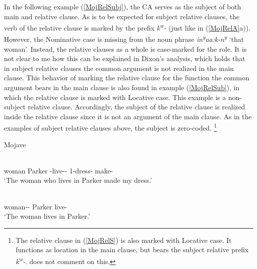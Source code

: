 In the following example (\ref{MojRelSubj}), the CA serves as the subject of both main and relative clause. 
As is to be expected for subject relative clauses, the verb of the relative clause is marked by the prefix \emph{k\textsuperscript{w}-} (just like in (\ref{MojRelA}a)).  
However, the Nominative case is missing from the noun phrase \emph{\textschwa in\textsuperscript{y}a\textglotstop a:k-n\textsuperscript{y}} `that woman'.
Instead, the relative clauses as a whole is case-marked for the role. 
It is not clear to me how this can be explained in Dixon's analysis, which holds that in subject relative clauses the common argument is not realized in the main clause.
This behavior of marking the relative clause for the function the common argument bears in the main clause is also found in example (\ref{MojRelSub}), in which the relative clause is marked with Locative case.
This example is a non-subject relative clause. 
Accordingly, the subject of the relative clause is realized inside the relative clause since it is not an argument of the main clause. 
As in the examples of subject relative clauses above, the subject is zero-coded.
\footnote{The relative clause in (\ref{MojRelS}) is also marked with Locative case. 
It functions as location in the main clause, but bears the subject relative prefix \emph{k\textsuperscript{w}-}. 
\citet{Munro:1976} does not comment on this.} 
\enlargethispage{\baselineskip}

\begin{exe}\ex\label{MojRelSubj} {Mojave} \citetext{\citealt[188]{Munro:1976}}\nopagebreak[4]
\begin{xlist}
\ex\gll  {\rm[}  \textipa{k\super{w}-n\super{y}avay{\rm]}-n\super{y}-\v c}  \\
woman Parker \relativ{}-live-\dem{}-\nom{} 1-dress-\dem{} make-\tns{}\\
`The woman who lives in Parker made my dress.'

\ex\gll{}  \\
woman-\dem{}-\nom{} Parker live-\tns{}\\
`The woman lives in Parker.'
\end{xlist}
\end{exe}

